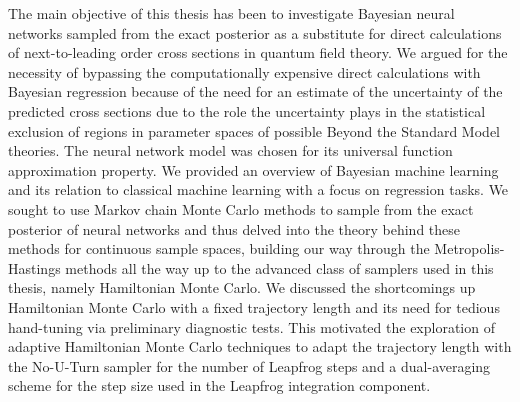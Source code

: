 The main objective of this thesis has been to investigate Bayesian neural networks sampled from the exact posterior as a substitute for direct calculations of next-to-leading order cross sections in quantum field theory. We argued for the necessity of bypassing the computationally expensive direct calculations with Bayesian regression because of the need for an estimate of the uncertainty of the predicted cross sections due to the role the uncertainty plays in the statistical exclusion of regions in parameter spaces of possible Beyond the Standard Model theories. The neural network model was chosen for its universal function approximation property. We provided an overview of Bayesian machine learning and its relation to classical machine learning with a focus on regression tasks. We sought to use Markov chain Monte Carlo methods to sample from the exact posterior of neural networks and thus delved into the theory behind these methods for continuous sample spaces, building our way through the Metropolis-Hastings methods all the way up to the advanced class of samplers used in this thesis, namely Hamiltonian Monte Carlo. We discussed the shortcomings up Hamiltonian Monte Carlo with a fixed trajectory length and its need for tedious hand-tuning via preliminary diagnostic tests. This motivated the exploration of adaptive Hamiltonian Monte Carlo techniques to adapt the trajectory length with the No-U-Turn sampler for the number of Leapfrog steps and a dual-averaging scheme for the step size used in the Leapfrog integration component. 


